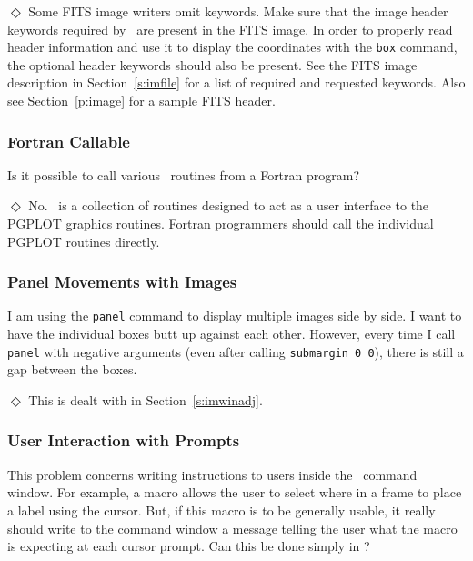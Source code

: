 \indent$\Diamond$
Some FITS image writers omit keywords.
Make sure that the image header keywords required by \wip\ are present
in the FITS image.
In order to properly read header information and use it to display
the coordinates with the {\tt box} command, the optional header keywords
should also be present.
See the FITS image description in Section~\ref{s:imfile} for a list of
required and requested keywords.
Also see Section~\ref{p:image} for a sample FITS header.

\subsubsection*         {Fortran Callable}

Is it possible to call various \wip\ routines from a Fortran program?

\indent$\Diamond$
No.
\wip\ is a collection of routines designed to act as a user interface to
the PGPLOT graphics routines.
Fortran programmers should call the individual PGPLOT routines directly.

\subsubsection*         {Panel Movements with Images}

I am using the {\tt panel} command to display multiple images side by side.
I want to have the individual boxes butt up against each other.
However, every time I call {\tt panel} with negative arguments (even
after calling {\tt submargin 0 0}),
there is still a gap between the boxes.

\indent$\Diamond$
This is dealt with in Section~\ref{s:imwinadj}.

\subsubsection*         {User Interaction with Prompts}

This problem concerns writing instructions to users inside
the \wip\ command window.
For example, a macro
allows the user to select where in a frame
to place a label using the cursor.
But, if this macro is to be generally usable,
it really should write to the
command window a message telling the user what the macro is expecting at
each cursor prompt.
Can this be done simply in \wip ?

